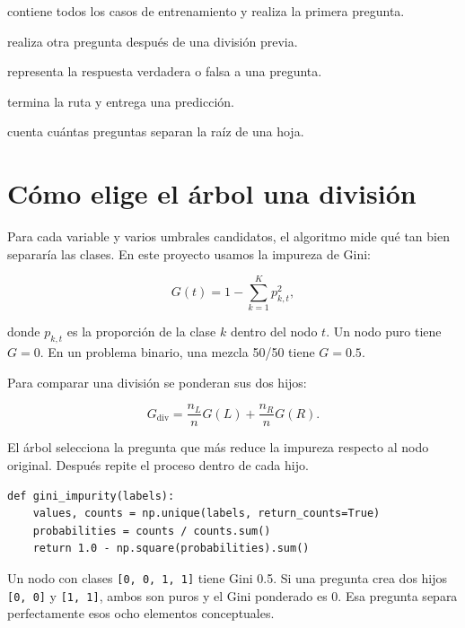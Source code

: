 \documentclass[11pt,oneside,openany]{book}
\begin{document}
\begin{description}[style=nextline]
  \item[Nodo raíz] contiene todos los casos de entrenamiento y realiza la primera pregunta.
  \item[Nodo interno] realiza otra pregunta después de una división previa.
  \item[Rama] representa la respuesta verdadera o falsa a una pregunta.
  \item[Hoja] termina la ruta y entrega una predicción.
  \item[Profundidad] cuenta cuántas preguntas separan la raíz de una hoja.
\end{description}

\chapter{Cómo elige el árbol una división}

Para cada variable y varios umbrales candidatos, el algoritmo mide qué tan bien
separaría las clases. En este proyecto usamos la impureza de Gini:

\begin{equation}
G(t) = 1 - \sum_{k=1}^{K} p_{k,t}^{2},
\end{equation}

donde $p_{k,t}$ es la proporción de la clase $k$ dentro del nodo $t$. Un nodo
puro tiene $G=0$. En un problema binario, una mezcla 50/50 tiene $G=0.5$.

Para comparar una división se ponderan sus dos hijos:

\begin{equation}
G_{\mathrm{div}} = \frac{n_L}{n}G(L) + \frac{n_R}{n}G(R).
\end{equation}

El árbol selecciona la pregunta que más reduce la impureza respecto al nodo
original. Después repite el proceso dentro de cada hijo.

\begin{lstlisting}
def gini_impurity(labels):
    values, counts = np.unique(labels, return_counts=True)
    probabilities = counts / counts.sum()
    return 1.0 - np.square(probabilities).sum()
\end{lstlisting}

\begin{idea}
Un nodo con clases \texttt{[0, 0, 1, 1]} tiene Gini 0.5. Si una pregunta crea
dos hijos \texttt{[0, 0]} y \texttt{[1, 1]}, ambos son puros y el Gini ponderado
es 0. Esa pregunta separa perfectamente esos ocho elementos conceptuales.
\end{idea}
\end{document}
